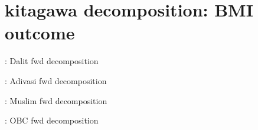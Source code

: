 \documentclass{article}
\begin{document}
\newpage
\section{kitagawa decomposition: BMI outcome}

\begin{table}[H]
    \centering
    \footnotesize %
    \caption{: Dalit fwd decomposition}
    \label{tab:sumstat}
\end{table}

\begin{table}[H]
    \centering
    \footnotesize %
    \caption{: Adivasi fwd decomposition}
    \label{tab:sumstat}
\end{table}



\begin{table}[H]
    \centering
    \footnotesize %
    \caption{: Muslim fwd decomposition}
    \label{tab:sumstat}
\end{table}

\begin{table}[H]
    \centering
    \footnotesize %
    \caption{: OBC fwd decomposition}
    \label{tab:sumstat}
\end{table}
\end{document}
